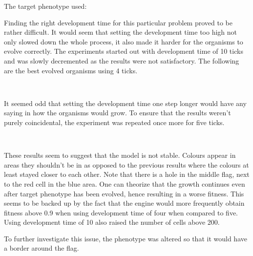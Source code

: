 \noindent The target phenotype used:

\begin{center}\end{center}

Finding the right development time for this particular problem proved to be rather difficult. It would seem that setting the development time too high not only slowed down the whole process, it also made it harder for the organisms to evolve correctly. The experiments started out with development time of 10 ticks and was slowly decremented as the results were not satisfactory. The following are the best evolved organisms using 4 ticks.

\begin{center}
	~
	~
\end{center}

It seemed odd that setting the development time one step longer would have any saying in how the organisms would grow. To ensure that the results weren't purely coincidental, the experiment was repeated once more for five ticks.

\begin{center}
	~
	~
\end{center}

These results seem to suggest that the model is not stable. Colours appear in areas they shouldn't be in as opposed to the previous results where the colours at least stayed closer to each other. Note that there is a hole in the middle flag, next to the red cell in the blue area. One can theorize that the growth continues even after target phenotype has been evolved, hence resulting in a worse fitness. This seems to be backed up by the fact that the engine would more frequently obtain fitness above 0.9 when using development time of four when compared to five. Using development time of 10 also raised the number of cells above 200.

To further investigate this issue, the phenotype was altered so that it would have a border around the flag.

\begin{center}\end{center}

